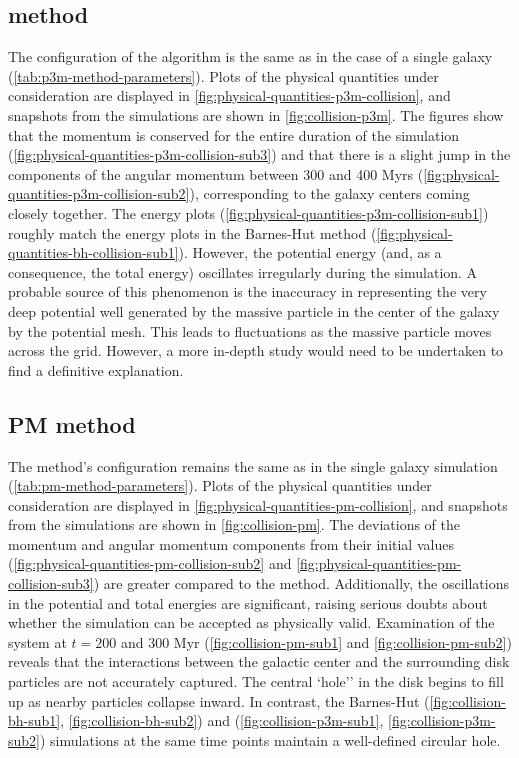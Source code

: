 \subsection{\texorpdfstring{\PThreeM{}}{P3M} method}
The configuration of the algorithm is the same as in the case of a single galaxy (\autoref{tab:p3m-method-parameters}).
Plots of the physical quantities under consideration are displayed in \autoref{fig:physical-quantities-p3m-collision}, and snapshots from the simulations are shown in \autoref{fig:collision-p3m}.
The figures show that the momentum is conserved for the entire duration of the simulation (\autoref{fig:physical-quantities-p3m-collision-sub3}) and that there is a slight jump in the components of the angular momentum between 300 and 400 Myrs (\autoref{fig:physical-quantities-p3m-collision-sub2}), corresponding to the galaxy centers coming closely together.
The energy plots (\autoref{fig:physical-quantities-p3m-collision-sub1}) roughly match the energy plots in the Barnes-Hut method (\autoref{fig:physical-quantities-bh-collision-sub1}).
However, the potential energy (and, as a consequence, the total energy) oscillates irregularly during the simulation.
A probable source of this phenomenon is the inaccuracy in representing the very deep potential well generated by the massive particle in the center of the galaxy by the potential mesh.
This leads to fluctuations as the massive particle moves across the grid.
However, a more in-depth study would need to be undertaken to find a definitive explanation.

\subsection{PM method}
The method's configuration remains the same as in the single galaxy simulation (\autoref{tab:pm-method-parameters}).
Plots of the physical quantities under consideration are displayed in \autoref{fig:physical-quantities-pm-collision}, and snapshots from the simulations are shown in \autoref{fig:collision-pm}.
The deviations of the momentum and angular momentum components from their initial values (\autoref{fig:physical-quantities-pm-collision-sub2} and \autoref{fig:physical-quantities-pm-collision-sub3}) are greater compared to the \PThreeM{} method.
Additionally, the oscillations in the potential and total energies are significant, raising serious doubts about whether the simulation can be accepted as physically valid.
Examination of the system at $t = 200$ and $300$ Myr (\autoref{fig:collision-pm-sub1} and \autoref{fig:collision-pm-sub2}) reveals that the interactions between the galactic center and the surrounding disk particles are not accurately captured.
The central `hole'' in the disk begins to fill up as nearby particles collapse inward.
In contrast, the Barnes-Hut (\autoref{fig:collision-bh-sub1}, \autoref{fig:collision-bh-sub2}) and \PThreeM{} (\autoref{fig:collision-p3m-sub1}, \autoref{fig:collision-p3m-sub2}) simulations at the same time points maintain a well-defined circular hole.